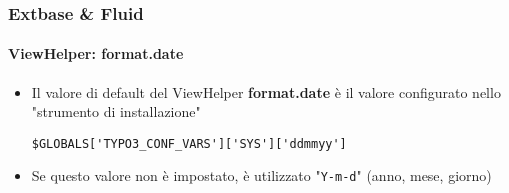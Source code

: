 
\begin{frame}[fragile]
        \frametitle{Extbase \& Fluid}
        \framesubtitle{ViewHelper: format.date}

        \lstset{
                basicstyle=\smaller\ttfamily
        }

        \begin{itemize}
                \item Il valore di default del ViewHelper \textbf{format.date} è il valore configurato nello "strumento di installazione"

                        \lstinline!$GLOBALS['TYPO3_CONF_VARS']['SYS']['ddmmyy']!

                \item Se questo valore non è impostato, è utilizzato "\texttt{Y-m-d}" (anno, mese, giorno)

        \end{itemize}

\end{frame}


